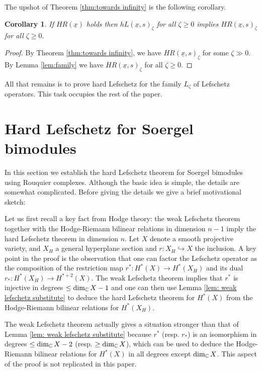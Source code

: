 \documentclass[11pt]{amsart}
\numberwithin{equation}{section}
\def\z{\zeta}
\def\un{\underline}
\def\to{\rightarrow}
\newtheorem{cor}[thm]{Corollary}
\theoremstyle{definition}
\theoremstyle{remark}
\begin{document}
{The upshot of Theorem \ref{thm:towards infinity} is the following corollary.

\begin{cor} If $HR(\un{x})$ holds then $hL(\un{x},s)_\z$ for all $\z \ge 0$ implies
  $HR(\un{x},s)_\z$ for all $\z \ge 0$. \end{cor}
	
\begin{proof} By Theorem \ref{thm:towards infinity}, we have
  $HR(\un{x},s)_\z$ for some $\z \gg 0$. By Lemma \ref{lem:family} we
  have $HR(\un{x},s)_\z$ for all $\z \ge 0$. \end{proof}

All that remains is to prove hard Lefschetz for the family $L_\z$ of
Lefschetz operators. This task occupies the rest of the paper.




\section{Hard Lefschetz for Soergel bimodules} \label{sec:HL}

In this section we establish the hard Lefschetz theorem for Soergel bimodules using Rouquier complexes. Although the basic idea is simple, the details are somewhat complicated. Before
giving the details we give a brief motivational sketch:

Let us first recall a key fact from Hodge theory: the weak Lefschetz theorem together with the Hodge-Riemann bilinear relations in dimension $n-1$ imply the hard Lefschetz theorem in
dimension $n$. Let $X$ denote a smooth projective variety, and $X_H$ a
general hyperplane section and $r : X_H \hookrightarrow X$ the inclusion. A key point in the proof is the observation that one can factor the Lefschetz operator as the composition of the restriction map $r^* : H^*(X) \to H^*(X_H)$ and its dual $r_* : H^*(X_H)
\to H^{*+2}(X)$. The weak Lefschetz theorem implies that $r^*$ is injective in degrees $\le \dim_{\mathbb{C}} X - 1$ and one can then use Lemma \ref{lem: weak lefschetz substitute} to deduce the
hard Lefschetz theorem for $H^*(X)$ from the Hodge-Riemann bilinear
relations for $H^*(X_H)$.

The weak Lefschetz theorem actually gives a situation stronger than that of Lemma \ref{lem: weak lefschetz substitute} because $r^*$ (resp. $r_*$) is an isomorphism in degrees $\le
\dim_{\mathbb{C}} X - 2$ (resp. $\ge \dim_{{\mathbb{C}}} X$), which can be used to deduce the Hodge-Riemann bilinear relations for $H^*(X)$ in all degrees except $\dim_{\mathbb{C}} X$. This aspect of
the proof is not replicated in this paper.

}
\end{document}
